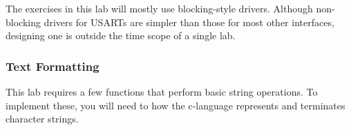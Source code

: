 \documentclass[openany,11pt,fleqn]{book} %
\begin{document}
The exercises in this lab will mostly use blocking-style drivers. Although non-blocking drivers for USARTs are simpler than those for most other interfaces, designing one is outside the time scope of a single lab. 
%
%
%


\subsubsection{Text Formatting}
This lab requires a few functions that perform basic string operations. To implement these, you will need to how the c-language represents and terminates character strings. 
\end{document}
